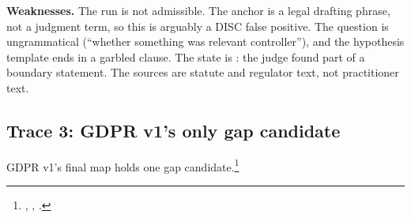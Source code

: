 \textbf{Weaknesses.} The run is not admissible. The anchor is a legal drafting phrase, not a
judgment term, so this is arguably a DISC false positive. The question is ungrammatical
(\enquote{whether something was relevant controller}), and the hypothesis template ends in a garbled
clause. The state is : the judge found part of a boundary statement. The sources are
statute and regulator text, not practitioner text.

\subsection{Trace 3: GDPR v1's only gap candidate}

GDPR v1's final map holds one gap candidate.\footnote{,
,  .}

